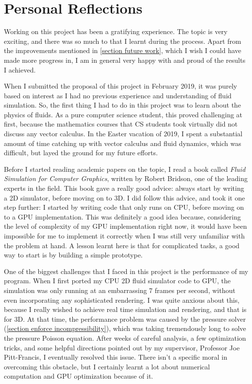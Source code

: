 \section{Personal Reflections}
Working on this project has been a gratifying experience. The topic is very exciting, and there was so much to that I learnt during the process. Apart from the improvements mentioned in \ref{section future work}, which I wish I could have made more progress in, I am in general very happy with and proud of the results I achieved.

When I submitted the proposal of this project in February 2019, it was purely based on interest as I had no previous experience and understanding of fluid simulation. So, the first thing I had to do in this project was to learn about the physics of fluids. As a pure computer science student, this proved challenging at first, because the mathematics courses that CS students took virtually did not discuss any vector calculus. In the Easter vacation of 2019, I spent a substantial amount of time catching up with vector calculus and fluid dynamics, which was difficult, but layed the ground for my future efforts.

Before I started reading academic papers on the topic, I read a book called \textit{Fluid Simulation for Computer Graphics}\cite{bridson2015fluid}, written by Robert Bridson, one of the leading experts in the field. This book gave a really good advice: always start by writing a 2D simulator, before moving on to 3D. I did follow this advice, and took it one step further: I started by writing code that only runs on CPU, before moving on to a GPU implementation. This was definitely a good idea because, considering the level of complexity of my GPU implementation right now, it would have been impossible for me to implement it correctly when I was still very unfamiliar with the problem at hand. A lesson learnt here is that for complicated tasks, a good way to start is by building a simple prototype.

One of the biggest challenges that I faced in this project is the performance of my program. When I first ported my CPU 2D fluid simulator code to GPU, the simulation was only running at an embarrassing 7 frames per second, without even incorporating any sophisticated rendering. I was quite anxious about this, because I really wished to achieve real time simulation and rendering, and that is for 3D. At that time, the performance problem was caused by the pressure solver (\ref{section enforce incompressibility}), which was taking tremendously long to solve the pressure Poisson equation. After weeks of careful analysis, a few optimization tricks, and some helpful directions pointed out by my supervisor, Professor Joe Pitt-Francis, I eventually resolved this issue. There isn't a specific moral in overcoming this obstacle, but I certainly learnt a lot about numerical computation and GPU optimization because of it.

